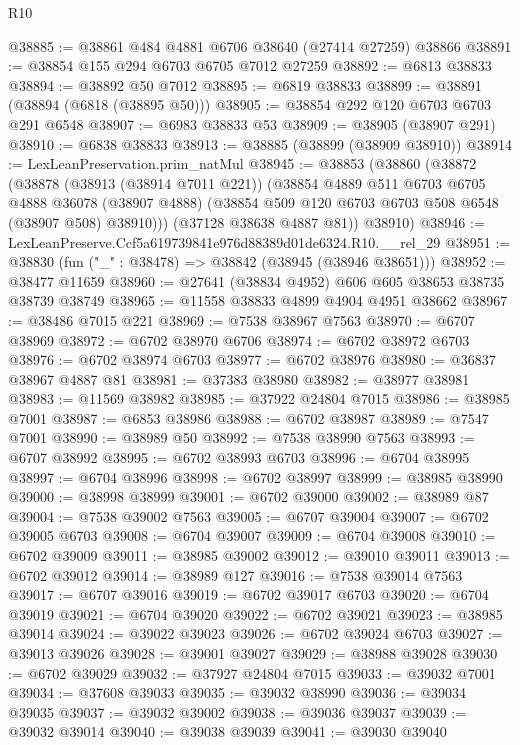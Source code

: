 \begin{lexlean}{R10}
\begin{coremodule}
@38885 := @38861 @484 @4881 @6706 @38640 (@27414 @27259) @38866
@38891 := @38854 @155 @294 @6703 @6705 @7012 @27259
@38892 := @6813 @38833
@38894 := @38892 @50 @7012
@38895 := @6819 @38833
@38899 := @38891 (@38894 (@6818 (@38895 @50)))
@38905 := @38854 @292 @120 @6703 @6703 @291 @6548
@38907 := @6983 @38833 @53
@38909 := @38905 (@38907 @291)
@38910 := @6838 @38833
@38913 := @38885 (@38899 (@38909 @38910))
@38914 := LexLeanPreservation.prim_natMul
@38945 := @38853
    (@38860
      (@38872
        (@38878
          (@38913 (@38914 @7011 @221))
          (@38854
            @4889
            @511
            @6703
            @6705
            @4888
            @36078
            (@38907 @4888)
            (@38854 @509 @120 @6703 @6703 @508 @6548 (@38907 @508) @38910)))
        (@37128 @38638 @4887 @81))
      @38910)
@38946 := LexLeanPreserve.Ccf5a619739841e976d88389d01de6324.R10.__rel_29
@38951 := @38830 (fun ("_" : @38478) => @38842 (@38945 (@38946 @38651)))
@38952 := @38477 @11659
@38960 := @27641 (@38834 @4952) @606 @605 @38653 @38735 @38739 @38749
@38965 := @11558 @38833 @4899 @4904 @4951 @38662
@38967 := @38486 @7015 @221
@38969 := @7538 @38967 @7563
@38970 := @6707 @38969
@38972 := @6702 @38970 @6706
@38974 := @6702 @38972 @6703
@38976 := @6702 @38974 @6703
@38977 := @6702 @38976
@38980 := @36837 @38967 @4887 @81
@38981 := @37383 @38980
@38982 := @38977 @38981
@38983 := @11569 @38982
@38985 := @37922 @24804 @7015
@38986 := @38985 @7001
@38987 := @6853 @38986
@38988 := @6702 @38987
@38989 := @7547 @7001
@38990 := @38989 @50
@38992 := @7538 @38990 @7563
@38993 := @6707 @38992
@38995 := @6702 @38993 @6703
@38996 := @6704 @38995
@38997 := @6704 @38996
@38998 := @6702 @38997
@38999 := @38985 @38990
@39000 := @38998 @38999
@39001 := @6702 @39000
@39002 := @38989 @87
@39004 := @7538 @39002 @7563
@39005 := @6707 @39004
@39007 := @6702 @39005 @6703
@39008 := @6704 @39007
@39009 := @6704 @39008
@39010 := @6702 @39009
@39011 := @38985 @39002
@39012 := @39010 @39011
@39013 := @6702 @39012
@39014 := @38989 @127
@39016 := @7538 @39014 @7563
@39017 := @6707 @39016
@39019 := @6702 @39017 @6703
@39020 := @6704 @39019
@39021 := @6704 @39020
@39022 := @6702 @39021
@39023 := @38985 @39014
@39024 := @39022 @39023
@39026 := @6702 @39024 @6703
@39027 := @39013 @39026
@39028 := @39001 @39027
@39029 := @38988 @39028
@39030 := @6702 @39029
@39032 := @37927 @24804 @7015
@39033 := @39032 @7001
@39034 := @37608 @39033
@39035 := @39032 @38990
@39036 := @39034 @39035
@39037 := @39032 @39002
@39038 := @39036 @39037
@39039 := @39032 @39014
@39040 := @39038 @39039
@39041 := @39030 @39040

\end{coremodule}
\end{lexlean}
